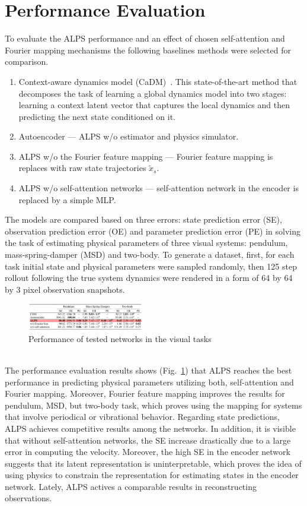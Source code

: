 \documentclass[acmtog]{techreportacmart}
\begin{document}
\section{Performance Evaluation}
To evaluate the ALPS performance and an effect of chosen self-attention and Fourier mapping mechanisms the following baselines methods were selected for comparison.
\begin{enumerate}
  \item Context-aware dynamics model (CaDM)~\cite{lee2020context}. This state-of-the-art method that decomposes the task of learning a global dynamics model into two stages: learning a context latent vector that captures the local dynamics and then predicting the next state conditioned on it.
  \item Autoencoder --- ALPS w/o estimator and physics simulator.
  \item ALPS w/o the Fourier feature mapping --- Fourier feature mapping is replaces with raw state trajectories ${\tilde{x}_{s}}$.
  \item ALPS w/o self-attention networks --- self-attention network in the encoder is replaced by a simple MLP.
\end{enumerate}
The models are compared based on three errors: state prediction error (SE), observation prediction error (OE) and parameter prediction error (PE) in solving the task of estimating physical parameters of three visual systems: pendulum, mass-spring-damper (MSD) and two-body. To generate a dataset, first, for each task initial state and physical parameters were sampled randomly, then 125 step rollout following the true system dynamics were rendered in a form of 64 by 64 by 3 pixel observation snapshots.
\begin{figure}
  \centering
  \includegraphics[width=0.45\textwidth]{ALPS_performance}
  \caption{Performance of tested networks in the visual tasks}
  \label{fig:performance}
\end{figure}
\\
The performance evaluation results shows (Fig.~\ref{fig:performance}) that ALPS reaches the best performance in predicting physical parameters utilizing both, self-attention and Fourier mapping. Moreover, Fourier feature mapping improves the results for pendulum, MSD, but two-body task, which proves using the mapping for systems that involve periodical or vibrational behavior. Regarding state predictions, ALPS achieves competitive results among the networks. In addition, it is visible that without self-attention networks, the SE increase drastically due to a large error in computing the velocity. Moreover, the high SE in the encoder network suggests that its latent representation is uninterpretable, which proves the idea of using physics to constrain the representation for estimating states in the encoder network. Lately, ALPS actives a comparable results in reconstructing observations. 
\end{document}
